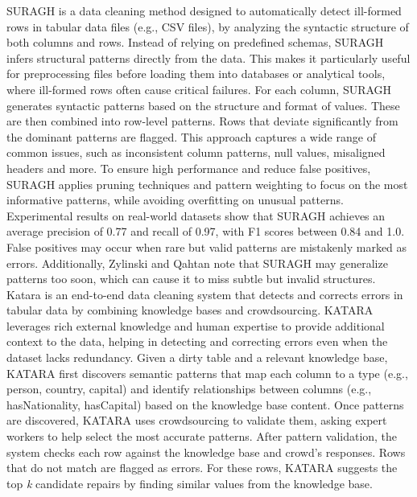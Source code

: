 \newline\newline
SURAGH \cite{SURAGH} is a data cleaning method designed to automatically detect ill-formed rows in tabular data files (e.g., CSV files), by analyzing the syntactic structure of both columns and rows. 
Instead of relying on predefined schemas, SURAGH infers structural patterns directly from the data. 
This makes it particularly useful for preprocessing files before loading them into databases or analytical tools, where ill-formed rows often cause critical failures. 
For each column, SURAGH generates syntactic patterns based on the structure and format of values. 
These are then combined into row-level patterns. 
Rows that deviate significantly from the dominant patterns are flagged. 
This approach captures a wide range of common issues, such as inconsistent column patterns, null values, misaligned headers and more. 
To ensure high performance and reduce false positives, SURAGH applies pruning techniques and pattern weighting to focus on the most informative patterns, while avoiding overfitting on unusual patterns. 
Experimental results on real-world datasets show that SURAGH achieves an average precision of 0.77 and recall of 0.97, with F1 scores between 0.84 and 1.0. 
False positives may occur when rare but valid patterns are mistakenly marked as errors. 
Additionally, Zylinski and Qahtan \cite{SYNODC} note that SURAGH may generalize patterns too soon, which can cause it to miss subtle but invalid structures. 
\newline\newline
Katara \cite{KATARA} is an end-to-end data cleaning system that detects and corrects errors in tabular data by combining knowledge bases and crowdsourcing. 
KATARA leverages rich external knowledge and human expertise to provide additional context to the data, helping in detecting and correcting errors even when the dataset lacks redundancy.  
Given a dirty table and a relevant knowledge base, KATARA first discovers semantic patterns that map each column to a type (e.g., person, country, capital) and identify relationships between columns (e.g., hasNationality, hasCapital) based on the knowledge base content.  
Once patterns are discovered, KATARA uses crowdsourcing to validate them, asking expert workers to help select the most accurate patterns. 
After pattern validation, the system checks each row against the knowledge base and crowd's responses. 
Rows that do not match are flagged as errors. 
For these rows, KATARA suggests the top \textit{k} candidate repairs by finding similar values from the knowledge base. 
